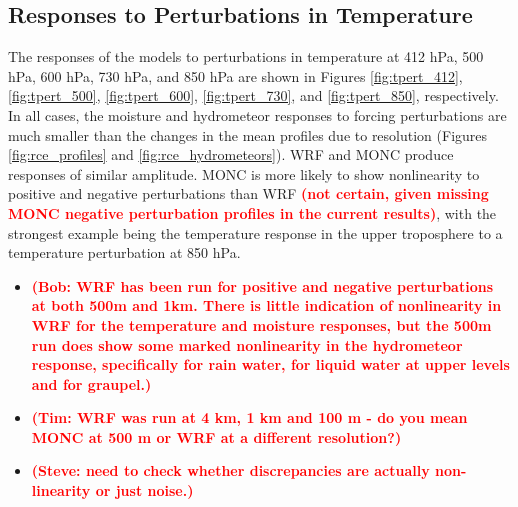 \documentclass[draft]{agujournal2019}
\newcommand{\todo}[1]{\textcolor{red}{\textbf{(#1)}}}
\begin{document}
\subsection{Responses to Perturbations in Temperature}

The responses of the models to perturbations in temperature at 412 hPa, 500 hPa,
600 hPa, 730 hPa, and 850 hPa are shown in Figures \ref{fig:tpert_412},
\ref{fig:tpert_500}, \ref{fig:tpert_600}, \ref{fig:tpert_730}, and
\ref{fig:tpert_850}, respectively. In all cases, the moisture and hydrometeor
responses to forcing perturbations are much smaller than the changes in the mean
profiles due to resolution (Figures \ref{fig:rce_profiles} and
\ref{fig:rce_hydrometeors}). WRF and MONC produce responses of similar
amplitude. MONC is more likely to show nonlinearity to positive and negative
perturbations than WRF \todo{not certain, given missing MONC negative
perturbation profiles in the current results}, with the strongest example being
the temperature response in the upper troposphere to a temperature perturbation
at 850 hPa. 

\begin{itemize}
   \item \todo{Bob: WRF has been run for positive and negative perturbations at
   both 500m and 1km. There is  little indication of nonlinearity in WRF for the
   temperature and moisture responses, but the 500m run does show some marked
   nonlinearity in the hydrometeor response, specifically for rain water, for
   liquid water at upper levels and for graupel.}
   \item \todo{Tim: WRF was run at 4 km, 1 km and 100 m - do you mean MONC at
   500 m or WRF at a different resolution?}
   \item \todo{Steve: need to check whether discrepancies are actually
   non-linearity or just noise.}
\end{itemize}
\end{document}

